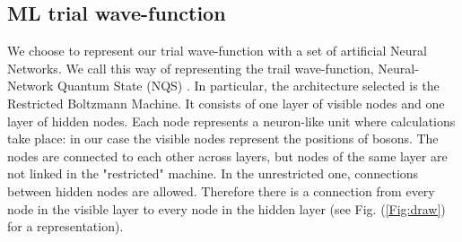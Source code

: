 %
%
%


\subsection{ML trial wave-function}
We choose to represent our trial wave-function with a set of artificial Neural Networks. We call this way of representing the trail wave-function, Neural-Network Quantum State (NQS) \cite{carleoSolvingQuantumManybody2017}. In particular, the architecture selected is the Restricted Boltzmann Machine. It consists of one layer of visible nodes and one layer of hidden nodes. Each node represents a neuron-like unit where calculations take place: in our case the visible nodes represent the positions of bosons. The nodes are connected to each other across layers, but nodes of the same layer are not linked in the "restricted" machine. In the unrestricted one, connections between hidden nodes are allowed. Therefore there is a connection from every node in the visible layer to every node in the hidden layer (see Fig. (\ref{Fig:draw}) for a representation). 

